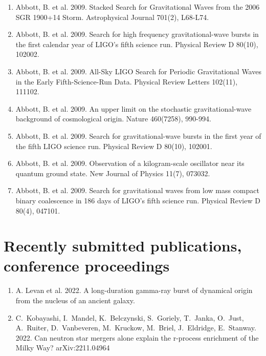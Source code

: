 \documentclass[margin,line]{res}
\begin{document}
\begin{resume}
\begin{enumerate}
\item Abbott, B. et al. 2009. Stacked Search for Gravitational Waves from the 2006 SGR 1900+14 Storm. Astrophysical Journal 701(2), L68-L74. 

\item Abbott, B. et al. 2009. Search for high frequency gravitational-wave bursts in the first calendar year of LIGO's fifth science run. Physical Review D 80(10),  102002. 

\item Abbott, B. et al. 2009. All-Sky LIGO Search for Periodic Gravitational Waves in the Early Fifth-Science-Run Data. Physical Review Letters 102(11), 111102. 

\item Abbott, B. et al. 2009. An upper limit on the stochastic gravitational-wave background of cosmological origin. Nature 460(7258), 990-994. 

\item Abbott, B. et al. 2009. Search for gravitational-wave bursts in the first year of the fifth LIGO science run. Physical Review D 80(10), 102001. 

\item Abbott, B. et al. 2009. Observation of a kilogram-scale oscillator near its quantum ground state. New Journal of Physics 11(7), 073032.

\item Abbott, B. et al. 2009. Search for gravitational waves from low mass compact binary coalescence in 186 days of LIGO's fifth science run. Physical Review D 80(4), 047101. 

\end{enumerate}

\section{\sc Recently submitted publications, conference proceedings}

\begin{enumerate}

\item A. Levan et al. 2022.  A long-duration gamma-ray burst of dynamical origin from the nucleus of an ancient galaxy.

\item C.~Kobayashi, I.~Mandel, K.~Belczynski, S.~Goriely, T.~Janka, O.~Just, A.~Ruiter, D.~Vanbeveren, M.~Kruckow, M.~Briel, J.~Eldridge, E.~Stanway.  2022.  Can neutron star mergers alone explain the r-process enrichment of the Milky Way?    arXiv:2211.04964


\end{enumerate}
\end{resume}
\end{document}
